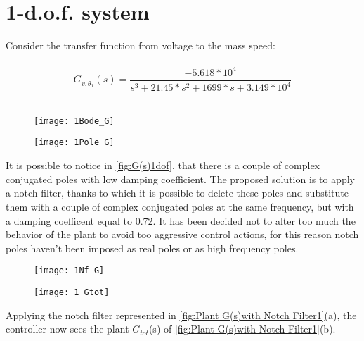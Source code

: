 \section{1-d.o.f. system}
Consider the transfer function from voltage to the mass speed:\\
\\
\[	
G_{v, \dot \theta_1}(s)=
\frac{-5.618*10^{4}}{{s^3+21.45*s^{2}}+1699*s+3.149*10^{4}}
\]
\\


\begin{figure*}[h]
	\centering
	\begin{subfigure}{0.4\columnwidth}
		\texttt{[image: 1Bode\_G]}
	\end{subfigure}
	\begin{subfigure}{0.4\columnwidth}
		\texttt{[image: 1Pole\_G]}
	\end{subfigure}
	\caption{G(s)}
	\label{fig:G(s)1dof}
\end{figure*}

It is possible to notice in \cref{fig:G(s)1dof}, that there is a couple of complex conjugated poles with low damping coefficient. The proposed solution is to apply a notch filter, thanks to which it is possible to delete these poles and substitute them with a couple of complex conjugated poles at the same frequency, but with a damping coefficent equal to 0.72. It has been decided not to alter too much the behavior of the plant to avoid too aggressive control actions, for this reason notch poles haven't been imposed as real poles or as high frequency poles.

\begin{figure*}[h]
	\centering
	\begin{subfigure}{0.35\columnwidth}
		\texttt{[image: 1Nf\_G]}
	\end{subfigure}
	\begin{subfigure}{0.35\columnwidth}
		\texttt{[image: 1\_Gtot]}
	\end{subfigure}
	\caption{Plant G(s) with Notch Filter Nf(s): $G_{tot}$(s)}
	\label{fig:Plant G(s)with Notch Filter1}
\end{figure*}


Applying the notch filter represented in \cref{fig:Plant G(s)with Notch Filter1}(a), the controller now sees the plant $G_{tot}$(s) of \cref{fig:Plant G(s)with Notch Filter1}(b).



